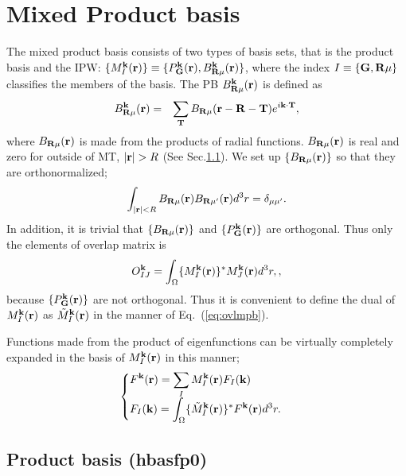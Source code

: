 \documentclass[a4paper,10pt,epsf,fleqn]{article}
\newcommand{\bfR}{{\bf R}}
\newcommand{\req}[1]{\mbox{Eq.~(\ref{#1})}}
\begin{document}
\section{Mixed Product basis}
\label{sec:mpbsec}
The mixed product basis consists of two types of basis sets, that is 
the product basis and the IPW:
$\{M^{\bf k}_I({\bf r}) \}\equiv 
\{ P^{\bf k}_{\bf G}({\bf r}), B_{\bfR\mu}^{\bf k}({\bf r})\}$,
where the index $I\equiv \{ {\bf G},\bfR\mu\}$ 
classifies the members of the basis.
The PB $B^{\bf k}_{\bfR\mu}({\bf r})$ is defined as
\begin{eqnarray}
  B^{\bf k}_{\bfR\mu}({\bf r}) &=& 
          \sum_{\bf T} B_{\bfR\mu}({\bf r-R}-{\bf T}) e^{i {\bf k\cdot T}},
\end{eqnarray}
where $B_{\bfR\mu}({\bf r})$ is made from the products of radial functions.
$B_{\bfR\mu}({\bf r})$ is real and
zero for outside of MT, $|{\bf r}| > R$ (See Sec.\ref{sec. PB}).
We set up $\{B_{\bfR\mu}({\bf r})\}$ so that they are orthonormalized;
\begin{eqnarray}
  \int_{|{\bf r}| < R} B_{\bfR\mu}({\bf r}) B_{\bfR\mu'}({\bf r}) d^3r =
  \delta_{\mu \mu'}.
  \label{eq. PB-ortho}
\end{eqnarray}
In addition, it is trivial that $\{B_{\bfR\mu}({\bf r})\}$ and 
$\{ P^{\bf k}_{\bf G}({\bf r})\}$ are orthogonal.
Thus only the elements of overlap matrix is
\begin{eqnarray}
 O^{\bf k}_{IJ}= 
  \int_\Omega \{M_I^{\bf k}({\bf r})\}^* {M}_J^{\bf k}({\bf r}) d^3r,
  \label{eq. ovlp},
\end{eqnarray}
because $\{ P^{\bf k}_{\bf G}({\bf r})\}$
are not orthogonal.
Thus it is convenient to define the dual of ${M}^{\bf k}_{I}({\bf r})$ as
$\tilde{M}^{\bf k}_{I}({\bf r})$ in the manner of \req{eq:ovlmpb}.

Functions made from the product of eigenfunctions can be
virtually completely expanded in the basis of ${M}^{\bf k}_{I}({\bf r})$
in this manner;
\begin{eqnarray}
\begin{cases}
  \displaystyle 
  F^{\bf k}({\bf r}) = \sum_I M_I^{\bf k} ({\bf r}) F_I({\bf k}) & \cr
  \displaystyle
  F_I({\bf k}) = 
  \int_\Omega \{\tilde{M}_I^{\bf k}({\bf r})\}^* 
  F^{\bf k}({\bf r}) d^3r.
\end{cases}
  \label{expandfk}
\end{eqnarray}


\subsection{Product basis (hbasfp0)}
\label{sec. PB}
\end{document}
